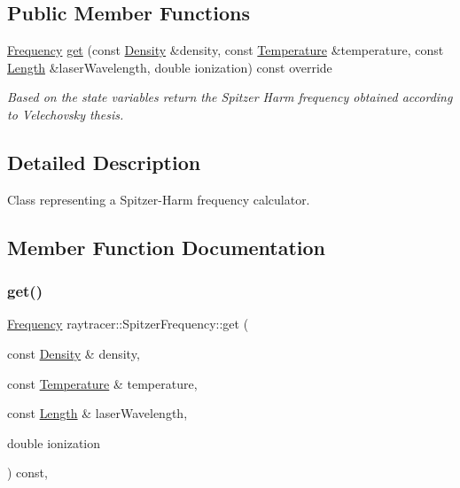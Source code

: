 \subsection*{Public Member Functions}
\begin{DoxyCompactItemize}
\item 
\hyperlink{structraytracer_1_1Frequency}{Frequency} \hyperlink{classraytracer_1_1SpitzerFrequency_aaead0d859dd82ad4ecc0a0805af954c5}{get} (const \hyperlink{structraytracer_1_1Density}{Density} \&density, const \hyperlink{structraytracer_1_1Temperature}{Temperature} \&temperature, const \hyperlink{structraytracer_1_1Length}{Length} \&laser\+Wavelength, double ionization) const override
\begin{DoxyCompactList}\small\item\em Based on the state variables return the Spitzer Harm frequency obtained according to Velechovsky thesis. \end{DoxyCompactList}\end{DoxyCompactItemize}


\subsection{Detailed Description}
Class representing a Spitzer-\/\+Harm frequency calculator. 

\subsection{Member Function Documentation}
\mbox{\label{classraytracer_1_1SpitzerFrequency_aaead0d859dd82ad4ecc0a0805af954c5}} 
\subsubsection{\texorpdfstring{get()}{get()}}
{\footnotesize\ttfamily \hyperlink{structraytracer_1_1Frequency}{Frequency} raytracer\+::\+Spitzer\+Frequency\+::get (\begin{DoxyParamCaption}\item[{const \hyperlink{structraytracer_1_1Density}{Density} \&}]{density,  }\item[{const \hyperlink{structraytracer_1_1Temperature}{Temperature} \&}]{temperature,  }\item[{const \hyperlink{structraytracer_1_1Length}{Length} \&}]{laser\+Wavelength,  }\item[{double}]{ionization }\end{DoxyParamCaption}) const\hspace{0.3cm}{\ttfamily [override]}, {\ttfamily [virtual]}}



